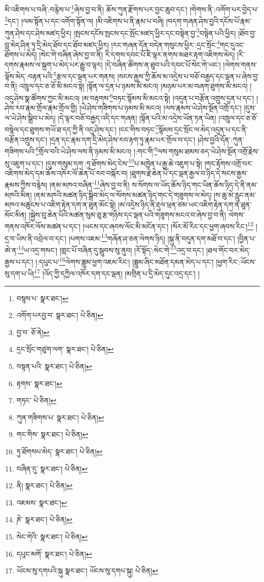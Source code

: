 མི་འཇིགས་པ་བཞི་:བརྙེས་པ་\footnote{བསྙས་པ་  སྣར་ཐང་། }ཞེས་བྱ་བ་ནི། ཆོས་ཀུན་རྫོགས་པར་བྱང་ཆུབ་དང་། །གེགས་ནི་:འགོག་པར་བྱེད་པ་\footnote{འགོག་པརབྱ་བ་  སྣར་ཐང་།  པེ་ཅིན། }དང་། །ལམ་སྟོན་པ་དང་འགོག་སྟོན་ལ། །མི་འཇིགས་པ་ནི་རྣམ་པ་བཞི། །བདག་གཞན་ཤེས་བྱའི་དངོས་པོ་རྣམ་ཀུན་ཤེས་དང་ཤེས་མཛད་ཕྱིར། །སྤངས་དངོས་སྤངས་དང་སྤོང་མཛད་ཕྱིར་དང་བསྟེན་བྱ་\footnote{བྱ་བ་  ཅོ་ནེ། }བསྟེན་པའི་ཕྱིར། །ཐོབ་བྱ་བླ་མེད་ཤིན་ཏུ་དྲི་མེད་ཐོབ་དང་ཐོབ་མཛད་ཕྱིར། །རང་གཞན་དོན་བདེན་གསུངས་ཕྱིར་:དྲང་སྲོང་\footnote{དྲང་སྲོང་གཙུག་ལག་  སྣར་ཐང་།  པེ་ཅིན། }གང་དུའང་ཐོགས་པ་མེད། །སེང་གེ་བཞིན་ཞེས་བྱ་བ་ནི། རི་དགས་དབང་པོ་ཇི་ལྟར་ནགས་མཐར་རྟག་འཇིགས་མེད། །རི་དགས་རྣམས་ལ་སྐྲག་པ་མེད་པར་རྒྱུ་བ་ལྟར། །དེ་བཞིན་ཚོགས་ན་ཐུབ་པའི་དབང་པོ་སེང་གེ་ཡང་། །ལེགས་གནས་ལྟོས་མེད་:བརྟན་པའི་\footnote{བསྟན་པའི་  སྣར་ཐང་།  པེ་ཅིན། }རྩལ་དང་ལྡན་པར་གནས། །སངས་རྒྱས་ཀྱི་ཆོས་མ་འདྲེས་པ་བཅོ་བརྒྱད་དང་ལྡན་པ་ཞེས་བྱ་བ་ནི། འཁྲུལ་དང་ཅ་ཅོ་མི་མངའ་སྟེ། །སྟོན་ལ་དྲན་པ་ཉམས་མི་མངའ། །མཉམ་པར་མ་བཞག་ཐུགས་མི་མངའ། །འདུ་ཤེས་སྣ་ཚོགས་ཀྱང་མི་མངའ། །མ་བརྟགས་\footnote{རྟགས་  སྣར་ཐང་། }བཏང་སྙོམས་མི་མངའ་སྟེ། །འདུན་པ་བརྩོན་འགྲུས་དྲན་པ་དང་། །ཤེས་རབ་རྣམ་གྲོལ་རྣམ་གྲོལ་གྱི། །ཡེ་ཤེས་གཟིགས་པ་ཉམས་མི་མངའ། །ལས་རྣམས་ཡེ་ཤེས་སྔོན་འགྲོ་དང་། །དུས་ལ་ཡེ་ཤེས་སྒྲིབ་པ་མེད། །དེ་ལྟར་བཅོ་བརྒྱད་འདི་དང་གཞན། །སྟོན་པའི་མ་འདྲེས་ཡོན་ཏན་ཡིན། །འཁྲུལ་དང་ཅ་ཅོ་བསྙེལ་དང་ཐུགས་གཡོ་ཐ་དད་ཀྱི་ནི་འདུ་ཤེས་དང་། །ངང་གིས་བཏང་\footnote{གཏང་  པེ་ཅིན། }སྙོམས་དྲང་སྲོང་ལ་མེད་འདུན་པ་དང་ནི་བརྩོན་འགྲུས་དང་། །དྲན་དང་རྣམ་དག་དྲི་མེད་ཤེས་རབ་རྟག་ཏུ་རྣམ་པར་གྲོལ་བ་དང་། །ཤེས་བྱའི་དོན་:ཀུན་གཟིགས་པའི་\footnote{ཀུན་གཟིགས་པ་  སྣར་ཐང་།  པེ་ཅིན། }གྲོལ་བའི་ཡེ་ཤེས་ལས་ནི་ཉམས་མི་མངའ། །:གང་གི་\footnote{གང་གིས་  སྣར་ཐང་།  པེ་ཅིན། }ལས་གསུམ་ཐམས་ཅད་ཡེ་ཤེས་སྔོན་འགྲོ་རྗེས་སུ་འཇུག་པ་དང་། །དུས་གསུམ་དག་:ཏུ་ཐོགས་མེད་ངེས་\footnote{ཏུ་ཐོགསཔ་མེད་  སྣར་ཐང་།  པེ་ཅིན། }པ་མཁྱེན་པ་རྒྱ་ཆེ་འཇུག་པ་སྟེ། །གང་རྟོགས་འགྲོ་བར་འཇིགས་མེད་དམ་ཆོས་འཁོར་ལོ་ཆེན་པོ་རབ་བསྐོར་བ། །ཐུགས་རྗེ་ཆེན་པོ་དང་ལྡན་རྒྱལ་བ་ཉིད་དེ་སངས་རྒྱས་རྣམས་ཀྱིས་བརྙེས། །ནམ་མཁའ་བཞིན་\footnote{བཞིན་དུ་  སྣར་ཐང་།  པེ་ཅིན། }ཞེས་བྱ་བ་ནི། ས་སོགས་ལ་ཡོད་ཆོས་ཉིད་གང་ཡིན་ཆོས་ཉིད་དེ་ནི་ནམ་མཁའི་མིན། །ནམ་མཁའི་མཚན་ཉིད་སྒྲིབ་མེད་ལ་སོགས་མཚན་ཉིད་གང་དེ་གཟུགས་ལ་མེད། །ས་ཆུ་མེ་རླུང་ནམ་མཁའ་མཚུངས་པ་འཇིག་རྟེན་དག་ན་ཐུན་མོང་སྟེ། །མ་འདྲེས་ཉིད་ནི་རྡུལ་ཕྲན་ཙམ་ཡང་འཇིག་རྟེན་དག་ན་ཐུན་མོང་མིན། །སྐྱེས་བུ་ཆེན་པོའི་མཚན་སུམ་ཅུ་རྩ་གཉིས་དང་ལྡན་པའི་གཟུགས་མངའ་བ་ཞེས་བྱ་བ་ནི། ལེགས་གནས་འཁོར་ལོས་མཚན་པ་དང་། །ཡངས་དང་ཞབས་ལོང་མི་མངོན་དང་། །སོར་མོ་རིང་དང་ཕྱག་ཞབས་རིང་།\footnote{ནི།  སྣར་ཐང་།  པེ་ཅིན། } །དྲ་བ་ཡིས་ནི་འབྲེལ་བ་དང་། །པགས་འཇམ་\footnote{འཇམས་  སྣར་ཐང་། }གཞོན་ཤ་ཅན་ལེགས་ཉིད། །སྐུ་ནི་བདུན་དག་མཐོ་བ་དང་། །བྱིན་པ་ཨེ་ན་\footnote{ཎེ་  སྣར་ཐང་།  པེ་ཅིན། }ཡ་འདྲ་གསང་། །གླང་པོ་བཞིན་དུ་སྦུབས་སུ་ནུབ། །རོ་སྟོད་:སེང་གེ་\footnote{སེང་གེའི་  སྣར་ཐང་།  པེ་ཅིན། }འདྲ་བ་དང་། །ཐལ་གོང་བར་མེད་རྒྱས་པ་དང་། །:དཔུང་པ་\footnote{དཔུང་མགོ་  སྣར་ཐང་།  པེ་ཅིན། }ལེགས་ཟླུམ་ཕྱག་འཇམ་རིང་། །ཟླུམ་ཞིང་མཐོན་དམན་མེད་པ་དང་། །ཕྱག་རིང་:ཡོངས་སུ་དག་པ་ཡི།\footnote{ཡོངས་སུ་དགཔའི་སྐུ  སྣར་ཐང་། ཡོངས་སུ་དགཔ་སྐུ།  པེ་ཅིན། } །འོད་ཀྱི་དཀྱིལ་འཁོར་དག་དང་ལྡན། །མགྲིན་པ་དྲི་མེད་དུང་འདྲ་དང་། །
